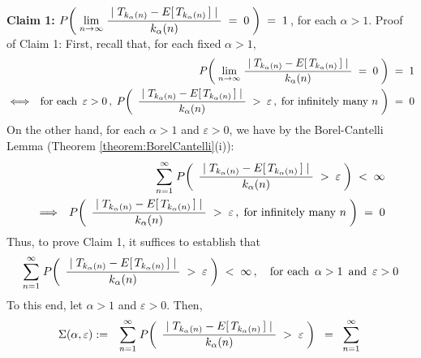\begin{enumerate}
\vskip 0.5cm
\noindent
\textbf{Claim 1:}\quad\quad
$P\!\left(\;
	\underset{n\rightarrow\infty}{\lim}\;
		\dfrac{{\color{white}.}\vert\;T_{k_{\alpha}(n)} - E[\,T_{k_{\alpha}(n)}\,]\;\vert{\color{white}.}}{k_{\alpha}(n)}
	\;=\;0
	\;\right)
\;=\;1$\,, for each $\alpha > 1$.
\vskip 0.3cm
\noindent
Proof of Claim 1:\quad
First, recall that, for each fixed $\alpha > 1$,
\begin{eqnarray*}
&&
	P\!\left(\;
	\underset{n\rightarrow\infty}{\lim}\;
		\dfrac{{\color{white}.}\vert\;T_{k_{\alpha}(n)} - E[\,T_{k_{\alpha}(n)}\,]\;\vert{\color{white}.}}{k_{\alpha}(n)}
	\;=\;0
	\;\right)
	\;=\;1
\\
&\Longleftrightarrow&
	\textnormal{for each \,$\varepsilon > 0$}\,,\;
	P\!\left(\;\,
		\dfrac{{\color{white}.}\vert\;T_{k_{\alpha}(n)} - E[\,T_{k_{\alpha}(n)}\,]\;\vert{\color{white}.}}{k_{\alpha}(n)}
		\;>\;\varepsilon\,,\;\textnormal{for infinitely many $n$}
		\;\right)
	\;=\;0
\end{eqnarray*}
On the other hand, for each $\alpha > 1$ and $\varepsilon > 0$, we have by
the Borel-Cantelli Lemma (Theorem \ref{theorem:BorelCantelli}(i)):
\begin{eqnarray*}
&&
	\overset{\infty}{\underset{n=1}{\sum}}\;
		P\!\left(\;\,
			\dfrac{{\color{white}.}\vert\;T_{k_{\alpha}(n)} - E[\,T_{k_{\alpha}(n)}\,]\;\vert{\color{white}.}}{k_{\alpha}(n)}
			\;>\;\varepsilon
			\;\right)
	\;<\; \infty
\\
&\Longrightarrow&
	P\!\left(\;\,
		\dfrac{{\color{white}.}\vert\;T_{k_{\alpha}(n)} - E[\,T_{k_{\alpha}(n)}\,]\;\vert{\color{white}.}}{k_{\alpha}(n)}
		\;>\;\varepsilon\,,\;\textnormal{for infinitely many $n$}
		\;\right)
	\;=\;0
\end{eqnarray*}
Thus, to prove Claim 1, it suffices to establish that
\begin{equation*}
\overset{\infty}{\underset{n=1}{\sum}}\;
	P\!\left(\;\,
		\dfrac{{\color{white}.}\vert\;T_{k_{\alpha}(n)} - E[\,T_{k_{\alpha}(n)}\,]\;\vert{\color{white}.}}{k_{\alpha}(n)}
		\;>\;\varepsilon
		\;\right)
\;<\; \infty\,,
\quad\textnormal{for each \,$\alpha > 1$\, and \,$\varepsilon > 0$}
\end{equation*}
To this end, let $\alpha > 1$ and $\varepsilon > 0$. Then,
\begin{eqnarray*}
\Sigma(\alpha,\varepsilon)
& := &
	\overset{\infty}{\underset{n=1}{\sum}}\;
	P\!\left(\;\,
		\dfrac{{\color{white}.}\vert\;T_{k_{\alpha}(n)} - E[\,T_{k_{\alpha}(n)}\,]\;\vert{\color{white}.}}{k_{\alpha}(n)}
		\;>\;\varepsilon
		\;\right)
	\;\; = \;\;
	\overset{\infty}{\underset{n=1}{\sum}}\;

\end{eqnarray*}
\end{enumerate}
